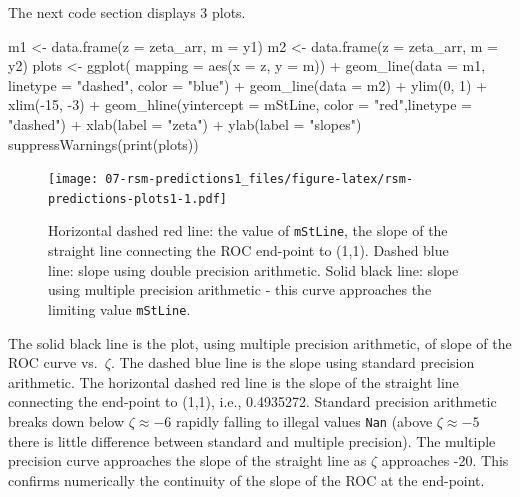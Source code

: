 \documentclass[
]{book}
\newenvironment{Shaded}{\begin{snugshade}}{\end{snugshade}}
\newcommand{\AttributeTok}[1]{\textcolor[rgb]{0.77,0.63,0.00}{#1}}
\newcommand{\DecValTok}[1]{\textcolor[rgb]{0.00,0.00,0.81}{#1}}
\newcommand{\FunctionTok}[1]{\textcolor[rgb]{0.00,0.00,0.00}{#1}}
\newcommand{\NormalTok}[1]{#1}
\newcommand{\OtherTok}[1]{\textcolor[rgb]{0.56,0.35,0.01}{#1}}
\newcommand{\SpecialCharTok}[1]{\textcolor[rgb]{0.00,0.00,0.00}{#1}}
\newcommand{\StringTok}[1]{\textcolor[rgb]{0.31,0.60,0.02}{#1}}
\begin{document}
The next code section displays 3 plots.

\begin{Shaded}
\begin{Highlighting}[]
\NormalTok{m1 }\OtherTok{\textless{}{-}} \FunctionTok{data.frame}\NormalTok{(}\AttributeTok{z =}\NormalTok{ zeta\_arr, }\AttributeTok{m =}\NormalTok{ y1)}
\NormalTok{m2 }\OtherTok{\textless{}{-}} \FunctionTok{data.frame}\NormalTok{(}\AttributeTok{z =}\NormalTok{ zeta\_arr, }\AttributeTok{m =}\NormalTok{ y2)}
\NormalTok{plots }\OtherTok{\textless{}{-}} \FunctionTok{ggplot}\NormalTok{(}
  \AttributeTok{mapping =} \FunctionTok{aes}\NormalTok{(}\AttributeTok{x =}\NormalTok{ z, }\AttributeTok{y =}\NormalTok{ m)) }\SpecialCharTok{+} 
  \FunctionTok{geom\_line}\NormalTok{(}\AttributeTok{data =}\NormalTok{ m1, }\AttributeTok{linetype =} \StringTok{"dashed"}\NormalTok{, }\AttributeTok{color =} \StringTok{"blue"}\NormalTok{) }\SpecialCharTok{+} 
  \FunctionTok{geom\_line}\NormalTok{(}\AttributeTok{data =}\NormalTok{ m2) }\SpecialCharTok{+}
  \FunctionTok{ylim}\NormalTok{(}\DecValTok{0}\NormalTok{, }\DecValTok{1}\NormalTok{) }\SpecialCharTok{+} \FunctionTok{xlim}\NormalTok{(}\SpecialCharTok{{-}}\DecValTok{15}\NormalTok{, }\SpecialCharTok{{-}}\DecValTok{3}\NormalTok{) }\SpecialCharTok{+} 
  \FunctionTok{geom\_hline}\NormalTok{(}\AttributeTok{yintercept =}\NormalTok{ mStLine, }\AttributeTok{color =} \StringTok{"red"}\NormalTok{,}\AttributeTok{linetype =} \StringTok{"dashed"}\NormalTok{) }\SpecialCharTok{+} 
  \FunctionTok{xlab}\NormalTok{(}\AttributeTok{label =} \StringTok{"zeta"}\NormalTok{) }\SpecialCharTok{+} \FunctionTok{ylab}\NormalTok{(}\AttributeTok{label =} \StringTok{"slopes"}\NormalTok{)}
\FunctionTok{suppressWarnings}\NormalTok{(}\FunctionTok{print}\NormalTok{(plots))}
\end{Highlighting}
\end{Shaded}

\begin{figure}
\centering
\texttt{[image: 07-rsm-predictions1\_files/figure-latex/rsm-predictions-plots1-1.pdf]}
\caption{\label{fig:rsm-predictions-plots1}Horizontal dashed red line: the value of \texttt{mStLine}, the slope of the straight line connecting the ROC end-point to (1,1). Dashed blue line: slope using double precision arithmetic. Solid black line: slope using multiple precision arithmetic - this curve approaches the limiting value \texttt{mStLine}.}
\end{figure}

The solid black line is the plot, using multiple precision arithmetic, of slope of the ROC curve vs.~\(\zeta\). The dashed blue line is the slope using standard precision arithmetic. The horizontal dashed red line is the slope of the straight line connecting the end-point to (1,1), i.e., 0.4935272. Standard precision arithmetic breaks down below \(\zeta \approx -6\) rapidly falling to illegal values \texttt{Nan} (above \(\zeta \approx -5\) there is little difference between standard and multiple precision). The multiple precision curve approaches the slope of the straight line as \(\zeta\) approaches -20. This confirms numerically the continuity of the slope of the ROC at the end-point.
\end{document}
